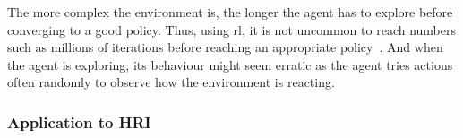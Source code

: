 	The more complex the environment is, the longer the agent has to explore before converging to a good policy. Thus, using \gls{rl}, it is not uncommon to reach numbers such as millions of iterations before reaching an appropriate policy~\citep{sutton1998reinforcement}. And when the agent is exploring, its behaviour might seem erratic as the agent tries actions often randomly to observe how the environment is reacting.
	
	
	\subsubsection{Application to HRI}
	
